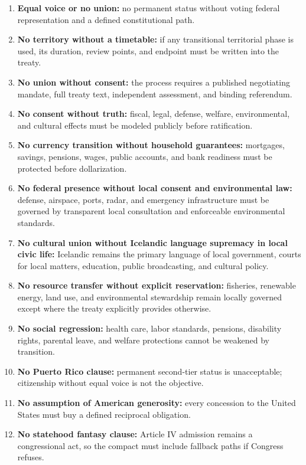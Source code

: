 \documentclass[11pt,a4paper]{article}
\begin{document}
\begin{enumerate}
  \item \textbf{Equal voice or no union:} no permanent status without voting federal representation and a defined constitutional path.
  \item \textbf{No territory without a timetable:} if any transitional territorial phase is used, its duration, review points, and endpoint must be written into the treaty.
  \item \textbf{No union without consent:} the process requires a published negotiating mandate, full treaty text, independent assessment, and binding referendum.
  \item \textbf{No consent without truth:} fiscal, legal, defense, welfare, environmental, and cultural effects must be modeled publicly before ratification.
  \item \textbf{No currency transition without household guarantees:} mortgages, savings, pensions, wages, public accounts, and bank readiness must be protected before dollarization.
  \item \textbf{No federal presence without local consent and environmental law:} defense, airspace, ports, radar, and emergency infrastructure must be governed by transparent local consultation and enforceable environmental standards.
  \item \textbf{No cultural union without Icelandic language supremacy in local civic life:} Icelandic remains the primary language of local government, courts for local matters, education, public broadcasting, and cultural policy.
  \item \textbf{No resource transfer without explicit reservation:} fisheries, renewable energy, land use, and environmental stewardship remain locally governed except where the treaty explicitly provides otherwise.
  \item \textbf{No social regression:} health care, labor standards, pensions, disability rights, parental leave, and welfare protections cannot be weakened by transition.
  \item \textbf{No Puerto Rico clause:} permanent second-tier status is unacceptable; citizenship without equal voice is not the objective.
  \item \textbf{No assumption of American generosity:} every concession to the United States must buy a defined reciprocal obligation.
  \item \textbf{No statehood fantasy clause:} Article IV admission remains a congressional act, so the compact must include fallback paths if Congress refuses.

\end{enumerate}
\end{document}
